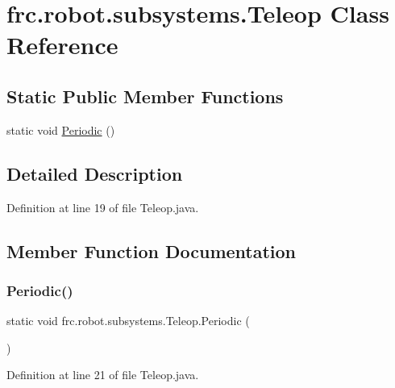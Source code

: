 \hypertarget{classfrc_1_1robot_1_1subsystems_1_1_teleop}{}\section{frc.\+robot.\+subsystems.\+Teleop Class Reference}
\label{classfrc_1_1robot_1_1subsystems_1_1_teleop}
\subsection*{Static Public Member Functions}
\begin{DoxyCompactItemize}
\item 
static void \hyperlink{classfrc_1_1robot_1_1subsystems_1_1_teleop_ae90969b779b855da532e50706fa33401}{Periodic} ()
\end{DoxyCompactItemize}


\subsection{Detailed Description}


Definition at line 19 of file Teleop.\+java.



\subsection{Member Function Documentation}
\mbox{\label{classfrc_1_1robot_1_1subsystems_1_1_teleop_ae90969b779b855da532e50706fa33401}} 
\subsubsection{\texorpdfstring{Periodic()}{Periodic()}}
{\footnotesize\ttfamily static void frc.\+robot.\+subsystems.\+Teleop.\+Periodic (\begin{DoxyParamCaption}{ }\end{DoxyParamCaption})\hspace{0.3cm}{\ttfamily [static]}}



Definition at line 21 of file Teleop.\+java.

